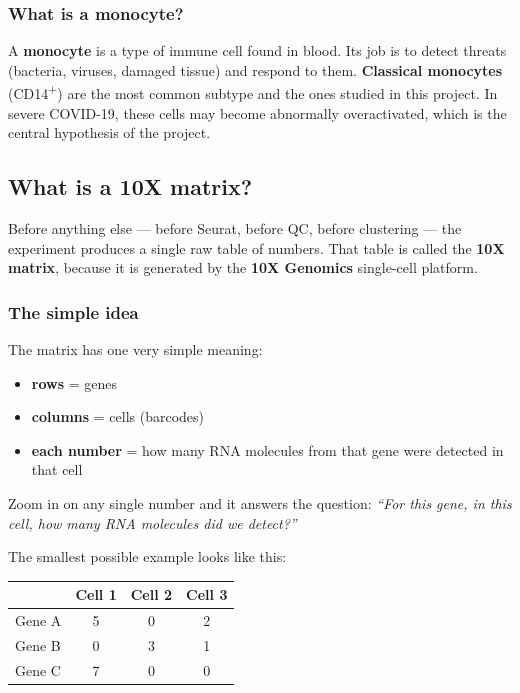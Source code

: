 \documentclass[11pt, a4paper]{article}
\begin{document}
\subsubsection{What is a monocyte?}

A \textbf{monocyte} is a type of immune cell found in blood. Its job is to detect
threats (bacteria, viruses, damaged tissue) and respond to them.
\textbf{Classical monocytes} (CD14\textsuperscript{+}) are the most common subtype
and the ones studied in this project. In severe COVID-19, these cells may become
abnormally overactivated, which is the central hypothesis of the project.

\subsection{What is a 10X matrix?}

Before anything else — before Seurat, before QC, before clustering — the experiment
produces a single raw table of numbers. That table is called the \textbf{10X matrix},
because it is generated by the \textbf{10X Genomics} single-cell platform.

\subsubsection{The simple idea}

The matrix has one very simple meaning:

\begin{itemize}[nosep]
  \item \textbf{rows} = genes
  \item \textbf{columns} = cells (barcodes)
  \item \textbf{each number} = how many RNA molecules from that gene were detected in that cell
\end{itemize}

Zoom in on any single number and it answers the question:
\emph{``For this gene, in this cell, how many RNA molecules did we detect?''}

The smallest possible example looks like this:

\begin{center}
\begin{tabular}{lccc}
\toprule
        & Cell 1 & Cell 2 & Cell 3 \\
\midrule
Gene A  & 5      & 0      & 2      \\
Gene B  & 0      & 3      & 1      \\
Gene C  & 7      & 0      & 0      \\
\bottomrule
\end{tabular}
\end{center}
\end{document}
